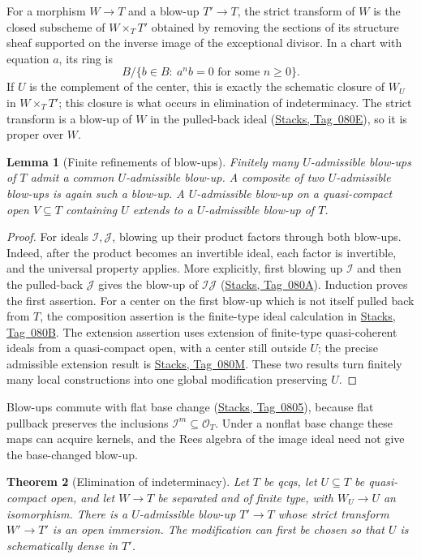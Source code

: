 \documentclass[11pt,a4paper]{article}
\numberwithin{equation}{section}
\newtheorem{theorem}{Theorem}[section]
\newtheorem{lemma}[theorem]{Lemma}
\theoremstyle{definition}
\theoremstyle{remark}
\newcommand{\stacks}[1]{\href{https://stacks.math.columbia.edu/tag/#1}{\textnormal{Stacks, Tag~#1}}}
\begin{document}
For a morphism $W\to T$ and a blow-up $T'\to T$, the strict
transform of $W$ is the closed subscheme of $W\times_TT'$ obtained
by removing the sections of its structure sheaf supported on the
inverse image of the exceptional divisor. In a chart with equation
$a$, its ring is
\[
 B/\{b\in B:\ a^nb=0\text{ for some }n\geq0\}.
\]
If $U$ is the complement of the center, this is exactly the schematic
closure of $W_U$ in $W\times_TT'$; this closure is what occurs in
elimination of indeterminacy.
The strict transform is a blow-up of $W$ in the pulled-back ideal
(\stacks{080E}), so it is proper over $W$.

\begin{lemma}[Finite refinements of blow-ups]
\label{app:nagata-blowup-refinements}
Finitely many $U$-admissible blow-ups of $T$ admit a common
$U$-admissible blow-up. A composite of two $U$-admissible blow-ups is
again such a blow-up. A $U$-admissible blow-up on a quasi-compact
open $V\subseteq T$ containing $U$ extends to a $U$-admissible
blow-up of $T$.
\end{lemma}

\begin{proof}
For ideals $\mathcal I,\mathcal J$, blowing up their product factors
through both blow-ups. Indeed, after the product becomes an
invertible ideal, each factor is invertible, and the universal
property applies. More explicitly, first blowing up $\mathcal I$
and then the pulled-back $\mathcal J$ gives the blow-up of
$\mathcal I\mathcal J$ (\stacks{080A}). Induction proves the first
assertion. For a center on the first blow-up which is not itself
pulled back from $T$, the composition assertion is the finite-type
ideal calculation in \stacks{080B}.
The extension assertion uses extension of finite-type
quasi-coherent ideals from a quasi-compact open, with a center
still outside $U$; the precise admissible extension result is
\stacks{080M}. These two results turn finitely many local
constructions into one global modification preserving $U$.
\end{proof}

Blow-ups commute with flat base change (\stacks{0805}), because flat
pullback preserves the inclusions $\mathcal I^m\subseteq\mathcal O_T$.
Under a nonflat base change these maps can acquire kernels, and the
Rees algebra of the image ideal need not give the base-changed blow-up.

\begin{theorem}[Elimination of indeterminacy]
\label{app:nagata-elimination}
Let $T$ be qcqs, let $U\subseteq T$ be quasi-compact open, and let
$W\to T$ be separated and of finite type, with $W_U\to U$ an
isomorphism. There is a $U$-admissible blow-up $T'\to T$ whose
strict transform $W'\to T'$ is an open immersion. The modification
can first be chosen so that $U$ is schematically dense in $T'$.
\end{theorem}
\end{document}
